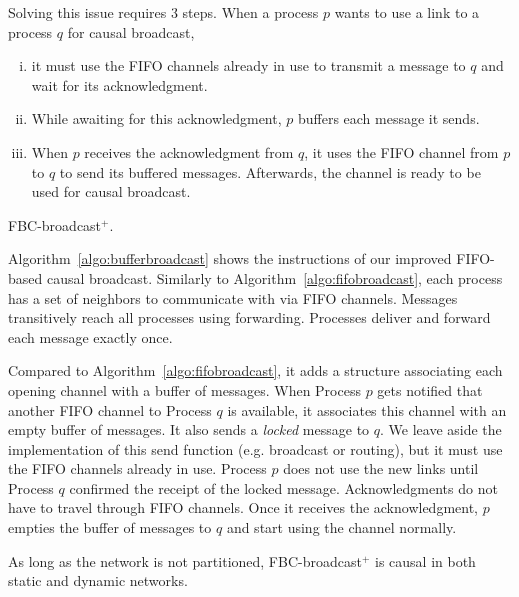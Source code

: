 Solving this issue requires 3 steps. When a process $p$ wants to use a link to a
process $q$ for causal broadcast,
\begin{enumerate}[(i)]
\item it must use the FIFO channels already in use to transmit a message to $q$
  and wait for its acknowledgment.
\item While awaiting for this acknowledgment, $p$ buffers each message it
  sends.
\item When $p$ receives the acknowledgment from $q$, it uses the FIFO channel
  from $p$ to $q$ to send its buffered messages. Afterwards, the channel is
  ready to be used for causal broadcast.
\end{enumerate}

\begin{algorithm}[h]
  
  \caption{\label{algo:bufferbroadcast}FBC-broadcast$^+$.}
\end{algorithm}


Algorithm~\ref{algo:bufferbroadcast} shows the instructions of our improved
FIFO-based causal broadcast. Similarly to Algorithm~\ref{algo:fifobroadcast},
each process has a set of neighbors to communicate with via FIFO
channels. Messages transitively reach all processes using forwarding. Processes
deliver and forward each message exactly once.  

Compared to Algorithm~\ref{algo:fifobroadcast}, it adds a structure associating
each opening channel with a buffer of messages. When Process $p$ gets notified
that another FIFO channel to Process $q$ is available, it associates this
channel with an empty buffer of messages. It also sends a \emph{locked} message
to $q$. We leave aside the implementation of this send function (e.g. broadcast
or routing), but it must use the FIFO channels already in use.  Process $p$ does
not use the new links until Process $q$ confirmed the receipt of the locked
message. Acknowledgments do not have to travel through FIFO channels.  Once it
receives the acknowledgment, $p$ empties the buffer of messages to $q$ and start
using the channel normally.

\begin{theorem}
  As long as the network is not partitioned, FBC-broadcast$^+$ is causal in both
  static and dynamic networks.
\end{theorem}


